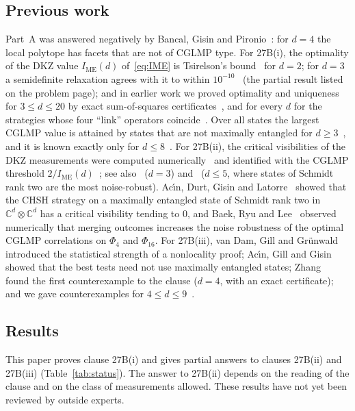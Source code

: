 \documentclass[11pt]{article}
\theoremstyle{remark}
\numberwithin{equation}{section}
\newcommand{\C}{\mathbb{C}}
\newcommand{\IME}{I_{\mathrm{ME}}}
\begin{document}
\subsection{Previous work}
Part~A was answered negatively by Bancal, Gisin and Pironio~\cite{BGP}: for $d=4$ the local polytope has facets that
are not of CGLMP type. For 27B(i), the optimality of the DKZ value $\IME(d)$ of~\eqref{eq:IME} is Tsirelson's
bound~\cite{Tsirelson} for $d=2$; for $d=3$ a semidefinite relaxation agrees with it to within $10^{-10}$~\cite{LVN}
(the partial result listed on the problem page); and in earlier work we proved optimality and uniqueness for
$3\le d\le20$ by exact sum-of-squares certificates~\cite{repoCGLMP}, and for every $d$ for the strategies whose four
``link'' operators coincide~\cite{MSclassical}. Over all states the largest CGLMP value is attained by states that are
not maximally entangled for $d\ge3$~\cite{ADGL}, and it is known exactly only for $d\le8$~\cite{IR,repoCGLMP}. For
27B(ii), the critical visibilities of the DKZ measurements were computed numerically~\cite{KGZMZ,DKZ} and identified
with the CGLMP threshold $2/\IME(d)$~\cite[eq.~(23)]{CGLMP}; see also~\cite{Chen01} ($d=3$) and~\cite{GLZ} ($d\le5$,
where states of Schmidt rank two are the most noise-robust). Ac\'{\i}n, Durt, Gisin and Latorre~\cite[eq.~(14)]{ADGL}
showed that the CHSH strategy on a maximally entangled state of Schmidt rank two in $\C^d\otimes\C^d$ has a critical
visibility tending to $0$, and Baek, Ryu and Lee~\cite{BRL} observed numerically that merging outcomes increases the
noise robustness of the optimal CGLMP correlations on $\Phi_4$ and $\Phi_{16}$. For 27B(iii), van Dam, Gill and
Gr\"unwald~\cite{vDGG} introduced the statistical strength of a nonlocality proof; Ac\'{\i}n, Gill and Gisin~\cite{AGG}
showed that the best tests need not use maximally entangled states; Zhang~\cite{Zhang} found the first counterexample to
the clause ($d=4$, with an exact certificate); and we gave counterexamples for $4\le d\le9$~\cite{repoCGLMP}.

\subsection{Results}
This paper proves clause 27B(i) and gives partial answers to clauses 27B(ii) and 27B(iii) (Table~\ref{tab:status}). The
answer to 27B(ii) depends on the reading of the clause and on the class of measurements allowed. These results have not
yet been reviewed by outside experts.
\end{document}
